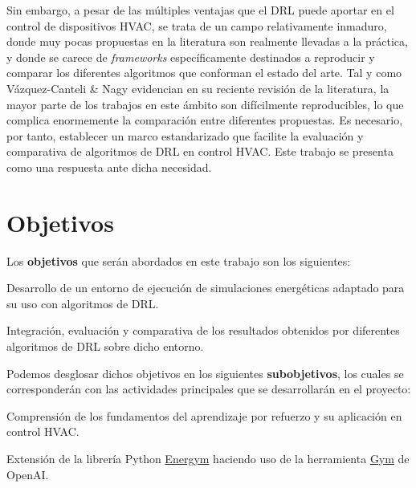 Sin embargo, a pesar de las múltiples ventajas que el DRL puede aportar en el control de dispositivos HVAC, se trata de un campo relativamente inmaduro, donde muy pocas propuestas en la literatura son realmente llevadas a la práctica, y donde se carece de  \textit{frameworks} específicamente destinados a reproducir y comparar los diferentes algoritmos que conforman el estado del arte. Tal y como Vázquez-Canteli \& Nagy \cite{vazquez2019reinforcement} evidencian en su reciente revisión de la literatura, la mayor parte de los trabajos en este ámbito son difícilmente reproducibles, lo que complica enormemente la comparación entre diferentes propuestas. Es necesario, por tanto, establecer un marco estandarizado que facilite la evaluación y comparativa de algoritmos de DRL en control HVAC. Este trabajo se presenta como una respuesta ante dicha necesidad.

\section{Objetivos}

Los \textbf{objetivos} que serán abordados en este trabajo son los siguientes:

\begin{tcolorbox}[colbacktitle=orange!30!white, title=Objetivo 1, coltitle=black, fonttitle=\bfseries]
Desarrollo de un entorno de ejecución de simulaciones energéticas adaptado para su uso con algoritmos de DRL.
\end{tcolorbox}

\begin{tcolorbox}[colbacktitle=orange!30!white, title=Objetivo 2,coltitle=black,fonttitle=\bfseries]
Integración, evaluación y comparativa de los resultados obtenidos por diferentes algoritmos de DRL sobre dicho entorno.
\end{tcolorbox}

Podemos desglosar dichos objetivos en los siguientes \textbf{subobjetivos}, los cuales se corresponderán con las actividades principales que se desarrollarán en el proyecto:

\begin{tcolorbox}[colbacktitle=orange!30!white, title=Subobjetivo 1, coltitle=black, fonttitle=\bfseries]
Comprensión de los fundamentos del aprendizaje por refuerzo y su aplicación en control HVAC.
\end{tcolorbox}

\begin{tcolorbox}[colbacktitle=orange!30!white, title=Subobjetivo 2, coltitle=black, fonttitle=\bfseries]
Extensión de la librería Python \href{https://github.com/jajimer/energym}{Energym} haciendo uso de la herramienta \href{https://gym.openai.com/}{Gym} de OpenAI.
\end{tcolorbox}

